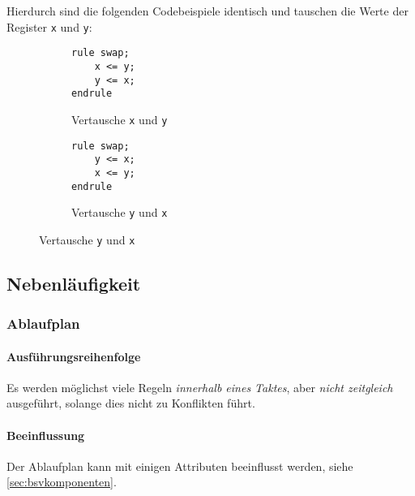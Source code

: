 			Hierdurch sind die folgenden Codebeispiele identisch und tauschen die Werte der Register \texttt{x} und \texttt{y}:
			\begin{figure}[ht]
				\centering
				\begin{subfigure}{0.4\textwidth}
					\begin{lstlisting}
rule swap;
	x <= y;
	y <= x;
endrule
					\end{lstlisting}
					\caption{Vertausche \texttt{x} und \texttt{y}}
				\end{subfigure}
				\begin{subfigure}{0.4\textwidth}
					\begin{lstlisting}
rule swap;
	y <= x;
	x <= y;
endrule
					\end{lstlisting}
					\caption{Vertausche \texttt{y} und \texttt{x}}
				\end{subfigure}
			\end{figure}

		\subsection{Nebenläufigkeit}
			\subsubsection{Ablaufplan}
				\paragraph{Ausführungsreihenfolge}
					Es werden möglichst viele Regeln \textit{innerhalb eines Taktes}, aber \textit{nicht zeitgleich} ausgeführt, solange dies nicht zu Konflikten führt.

				\paragraph{Beeinflussung}
					Der Ablaufplan kann mit einigen Attributen beeinflusst werden, siehe \ref{sec:bsvkomponenten}.

